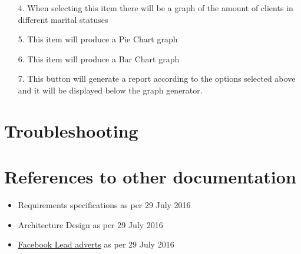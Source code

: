 \documentclass{article}
\begin{document}
\begin{enumerate}
\begin{itemize}
						\item[4.] When selecting this item there will be a graph of the amount of clients in different marital statuses
						\item[5.] This item will produce a Pie Chart graph
						\item[6.] This item will produce a Bar Chart graph
						\item[7.] This button will generate a report according to the options selected above and it will be displayed below the graph generator.
					\end{itemize}
			\end{enumerate}
	
	\section{Troubleshooting}

	\section{References to other documentation}
		\begin{itemize}
			\item{Requirements specifications as per 29 July 2016}
			\item{Architecture Design as per 29 July 2016}
			\item{\href{https://www.facebook.com/business/a/lead-ads}{Facebook Lead adverts} as per 29 July 2016}
		\end{itemize}
\end{document}
